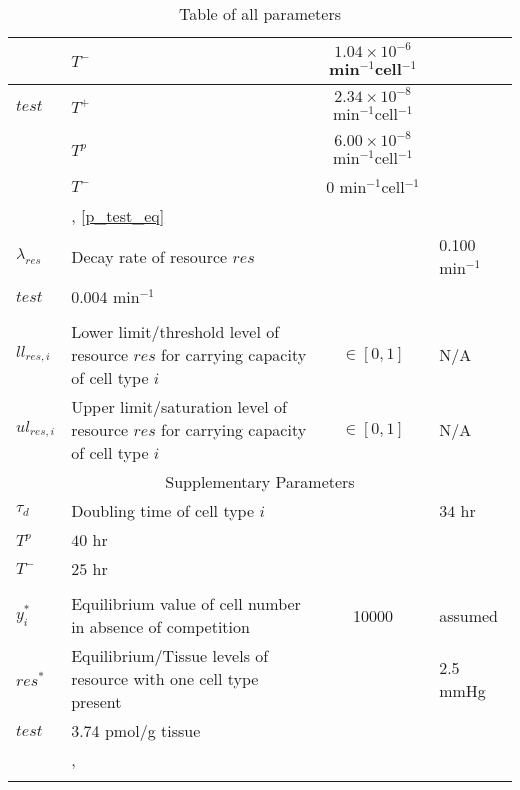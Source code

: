 \begin{longtable}[c]{|l|p{4.3cm}|c|p{2.3cm}|}
\begin{tabular}{l|l|l}
    & $T^-$ & $1.04 \times 10^{-6}$ \tiny{min$^{-1}$cell$^{-1}$}\\ \hline
    $test$ & $T^+$ & $2.34 \times 10^{-8}$ \tiny{min$^{-1}$cell$^{-1}$}\\
    & $T^p$ & $6.00 \times 10^{-8}$ \tiny{min$^{-1}$cell$^{-1}$}\\
    & $T^-$ & 0 \tiny{min$^{-1}$cell$^{-1}$}\\
  \end{tabular}
  & \cite{HailJr}, \autoref{p_test_eq}\\ \hline
  $\lambda_{res}$ & Decay rate of resource $res$ &
  \begin{tabular}{l|l}
    $O_2$ & 0.100 \tiny{min$^{-1}$}\\
    $test$ & 0.004 \tiny{min$^{-1}$}\\
  \end{tabular}
  & \cite{Jain}\\ \hline
  $ll_{res,i}$ & Lower limit/threshold level of resource $res$ for carrying capacity of cell type $i$ & $\in [0,1]$ & N/A \\ \hline
  $ul_{res,i}$ & Upper limit/saturation level of resource $res$ for carrying capacity of cell type $i$ & $\in [0,1]$ & N/A \\ \hline
  \multicolumn{4}{|c|}{Supplementary Parameters}\\ \hline
  $\tau_d$  & Doubling time of cell type $i$ &
  \begin{tabular}{l|l}
    $T^+$ & $34$ \tiny{hr} \\
    $T^p$ & $40$ \tiny{hr} \\
    $T^-$ & $25$ \tiny{hr} \\
  \end{tabular}
  & \cite{atcc} \\ \hline
  $y_i^*$ & Equilibrium value of cell number in absence of competition & 10000 & assumed \\ \hline
  $res^*$ & Equilibrium/Tissue levels of resource with one cell type present &
  \begin{tabular}{l|l}
    $O_2$    & 2.5 \tiny{mmHg}          \\
    $test$   & 3.74 \tiny{pmol/g tissue}\\
  \end{tabular}
  & \cite{Steward},\cite{Titus} \\ \hline

  \caption{Table of all parameters}
  \label{parmtable}\\
\end{longtable}
